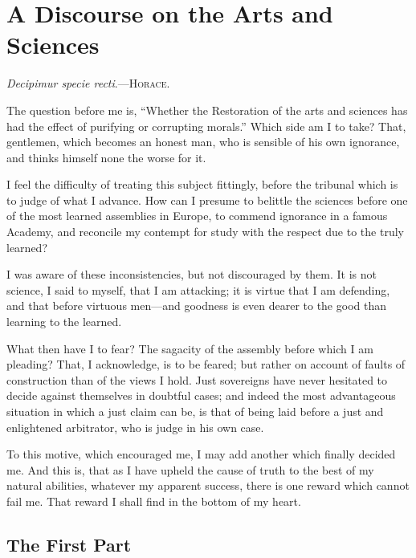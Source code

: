 
\author{Jean-Jacques Rousseau}
\chapter{A Discourse on the Arts and Sciences}

\begin{center}
\textit{Decipimur specie recti}.---\textsc{Horace}.
\end{center}

\noindent The question before me is, ``Whether the Restoration of the
arts and sciences has had the effect of purifying or corrupting
morals.'' Which side am I to take? That, gentlemen, which becomes an
honest man, who is sensible of his own ignorance, and thinks himself
none the worse for it.

I feel the difficulty of treating this subject fittingly, before the
tribunal which is to judge of what I advance. How can I presume to
belittle the sciences before one of the most learned assemblies in
Europe, to commend ignorance in a famous Academy, and reconcile my
contempt for study with the respect due to the truly learned?

I was aware of these inconsistencies, but not discouraged by them. It
is not science, I said to myself, that I am attacking; it is virtue
that I am defending, and that before virtuous men---and goodness is
even dearer to the good than learning to the learned.

What then have I to fear? The sagacity of the assembly before which I
am pleading? That, I acknowledge, is to be feared; but rather on
account of faults of construction than of the views I hold. Just
sovereigns have never hesitated to decide against themselves in
doubtful cases; and indeed the most advantageous situation in which a
just claim can be, is that of being laid before a just and enlightened
arbitrator, who is judge in his own case.

To this motive, which encouraged me, I may add another which finally
decided me. And this is, that as I have upheld the cause of truth to
the best of my natural abilities, whatever my apparent success, there
is one reward which cannot fail me. That reward I shall find in the
bottom of my heart.

\section*{The First Part}

